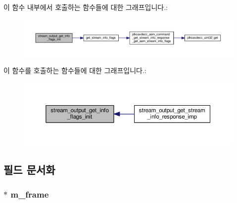 이 함수 내부에서 호출하는 함수들에 대한 그래프입니다.\+:
\nopagebreak
\begin{figure}[H]
\begin{center}
\leavevmode
\includegraphics[width=350pt]{classavdecc__lib_1_1stream__output__get__stream__info__response__imp_a838b71cbdb158e9863de39f19558edb2_cgraph}
\end{center}
\end{figure}




이 함수를 호출하는 함수들에 대한 그래프입니다.\+:
\nopagebreak
\begin{figure}[H]
\begin{center}
\leavevmode
\includegraphics[width=350pt]{classavdecc__lib_1_1stream__output__get__stream__info__response__imp_a838b71cbdb158e9863de39f19558edb2_icgraph}
\end{center}
\end{figure}




\subsection{필드 문서화}
\subsubsection[{\texorpdfstring{m\+\_\+frame}{m_frame}}]{$\ast$ m\+\_\+frame\hspace{0.3cm}{\ttfamily [private]}}\hypertarget{classavdecc__lib_1_1stream__output__get__stream__info__response__imp_a50417969cf438e7c8d698726bbbe2ff9}{}\label{classavdecc__lib_1_1stream__output__get__stream__info__response__imp_a50417969cf438e7c8d698726bbbe2ff9}


